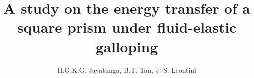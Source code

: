 \documentclass[preprint,cc]{elsarticle}
\newcommand{\reynoldsnumber}{\ensuremath{Re}}
\newcommand{\massstiff}{\ensuremath{\Pi_1}}
\newcommand{\massdamp}{\ensuremath{\Pi_2}}
\begin{document}
\begin{frontmatter}



\title{A study on the energy transfer of a square prism under fluid-elastic galloping}


\author{H.G.K.G. Jayatunga, B.T. Tan, J. S. Leontini}

\address{}

\begin{abstract}






\end{abstract}
\end{frontmatter}
\end{document}
